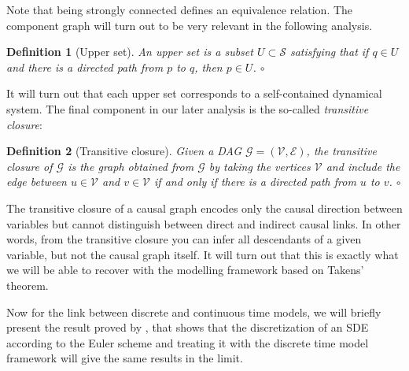 \documentclass[11pt, a4paper]{memoir}
\theoremstyle{break}
\theoremstyle{break}
\newtheorem{innerdefn}{Definition}
\newenvironment{defn}
  {\begin{innerdefn}}
  {\ensuremath{\circ}\end{innerdefn}}
\theoremstyle{nonumberplain}
\begin{document}
Note that being strongly connected defines an equivalence relation. The component graph will turn out to be very relevant in the following analysis.
\begin{defn}[Upper set]
An \emph{upper set} is a subset $U\subset \mathcal{S}$ satisfying that if $q\in U$ and there is a directed path from $p$ to $q$, then $p\in U$.
\end{defn}
It will turn out that each upper set corresponds to a self-contained dynamical system. The final component in our later analysis is the so-called \textit{transitive closure}:
\begin{defn}[Transitive closure]
Given a DAG $\mathcal{G}=(\mathcal{V},\mathcal{E})$, the \emph{transitive  closure of $\mathcal{G}$} is the graph obtained from $\mathcal{G}$ by taking the vertices $\mathcal{V}$ and include the edge between $u\in \mathcal{V}$ and $v\in \mathcal{V}$ if and only if there is a directed path from $u$ to $v$.
\end{defn}
The transitive closure of a causal graph encodes only the causal direction between variables but cannot distinguish between direct and indirect causal links. In other words, from the transitive closure you can infer all descendants of a given variable, but not the causal graph itself. It will turn out that this is exactly what we will be able to recover with the modelling framework based on Takens' theorem.

Now for the link between discrete and continuous time models, we will briefly present the result proved by \cite{sokol2014}, that shows that the discretization of an SDE according to the Euler scheme and treating it with the discrete time model framework will give the same results in the limit.
\end{document}
